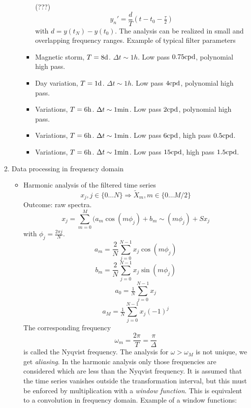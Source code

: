 \begin{enumerate}
\begin{itemize}
\begin{itemize}
      (???) \[
         y_n' = \frac{d}{T}(t - t_0 - \tfrac{\tau}{2})
       \] with \(d = y(t_N) - y(t_0)\). The analysis can be realized in
      small and overlapping frequency ranges. Example of typical filter
      parameters
    \item
      Magnetic storm, \(T = 8\mathrm{d}\). \(\Delta t\sim 1 h\). Low pass
      \(0.75\mathrm{cpd}\), polynomial high pass.
    \item
      Day variation, \(T = 1\mathrm{d}\). \(\Delta t\sim 1 h\). Low pass
      \(4\mathrm{cpd}\), polynomial high pass.
    \item
      Variations, \(T = 6\mathrm{h}\). \(\Delta t\sim 1 \mathrm{min}\).
      Low pass \(2\mathrm{cpd}\), polynomial high pass.
    \item
      Variations, \(T = 6\mathrm{h}\). \(\Delta t\sim 1 \mathrm{min}\).
      Low pass \(6\mathrm{cpd}\), high pass \(0.5\mathrm{cpd}\).
    \item
      Variations, \(T = 6\mathrm{h}\). \(\Delta t\sim 1 \mathrm{min}\).
      Low pass \(15\mathrm{cpd}\), high pass \(1.5\mathrm{cpd}\).
    \end{itemize}
  \end{itemize}
\item
  Data processing in frequency domain

  \begin{itemize}
  \tightlist
  \item
    Harmonic analysis of the filtered time series \[
       x_j , j\in\{0\ldots N\}
        \Rightarrow \tilde{X}_m, m\in\{0\ldots M/2\}
     \] Outcome: raw spectra. \[
       x_j = \sum_{m=0}^{M} (a_m\cos(m\phi_j) + b_m\sim(m\phi_j) + S x_j
     \] with \(\phi_j = \frac{2\pi j}{N}\). \[
       a_m = \frac{2}N \sum_{j=0}^{N-1} x_j\cos(m\phi_j)
     \] \[
       b_m = \frac{2}N \sum_{j=0}^{N-1} x_j\sin(m\phi_j)
     \] \[
       a_0 = \tfrac1N \sum_{j=0}^{N-1} x_j
     \] \[
       a_M = \tfrac1N \sum_{j=0}^{N-1} x_j(-1)^j
     \] The corresponding frequency \[
       \omega_m = \frac{2\pi}{T} = \frac{\pi}\Delta
     \] is called the Nyqvist frequency. The analysis for
    \(\omega > \omega_M\) is not unique, we get \emph{aliasing}. In the
    harmonic analysis only those frequencies are considered which are
    less than the Nyqvist frequency. It is assumed that the time series
    vanishes outside the transformation interval, but this must be
    enforced by multiplication with a \emph{window function}. This is
    equivalent to a convolution in frequency domain. Example of a window
    functions:


\end{itemize}
\end{enumerate}
